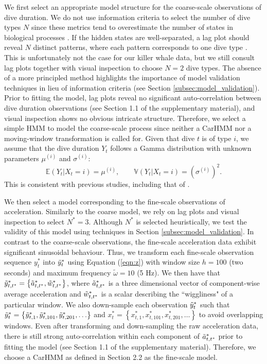 We first select an appropriate model structure for the coarse-scale observations of dive duration.
%
We do not use information criteria to select the number of dive types $N$ since these metrics tend to overestimate the number of states in biological processes \citep{Pohle:2017}. If the hidden states are well-separated, a lag plot should reveal $N$ distinct patterns, where each pattern corresponds to one dive type \citep{Lawler:2019}. This is unfortunately not the case for our killer whale data, but we still consult lag plots together with visual inspection to choose $N = 2$ dive types. The absence of a more principled method highlights the importance of model validation techniques in lieu of information criteria (see Section \ref{subsec:model_validation}).
%
Prior to fitting the model, lag plots reveal no significant auto-correlation between dive duration observations (see Section 1.1 of the supplementary material), and visual inspection shows no obvious intricate structure. Therefore, we select a simple HMM to model the coarse-scale process since neither a CarHMM nor a moving-window transformation is called for.
%
Given that dive $t$ is of type $i$, we assume that the dive duration $Y_t$ follows a Gamma distribution with unknown parameters $\mu^{(i)}$ and $\sigma^{(i)}$:
%
$$\mathbb{E}(Y_t|X_t = i) = \mu^{(i)}, \qquad \mathbb{V}(Y_t|X_t = i) = \left(\sigma^{(i)}\right)^2.$$
%
This is consistent with previous studies, including that of \citet{Barajas:2017}. 
%

We then select a model corresponding to the fine-scale observations of acceleration. Similarly to the coarse model, we rely on lag plots and visual inspection to select $N^*=3$. Although $N^*$ is selected heuristically, we test the validity of this model using techniques in Section \ref{subsec:model_validation}.
%
In contrast to the coarse-scale observations, the fine-scale acceleration data exhibit significant sinusoidal behaviour. Thus, we transform each fine-scale observation sequence $y_t^*$ into $\tilde{y}^*_t$ using Equation (\ref{eqn:z}) with window size $h=100$ (two seconds) and maximum frequency $\tilde{\omega}=10$ (5 Hz). 
We then have that $\tilde{y}^*_{t,t^*} = \left\{\tilde{a}^*_{t,t^*},\tilde{w}^*_{t,t^*}\right\}$, where $\tilde{a}^*_{t,t^*}$ is a three dimensional vector of component-wise average acceleration and $\tilde{w}^*_{t,t^*}$ is a scalar describing the ``wiggliness" of a particular window. We also down-sample each observation $\tilde{y}^*_t$ such that $\tilde{y}^*_t = \left\{\tilde{y}^*_{t,1},\tilde{y}^*_{t,101},\tilde{y}^*_{t,201},\ldots\right\}$ and $x^*_t = \left\{x^*_{t,1},x^*_{t,101},x^*_{t,201},\ldots\right\}$ to avoid overlapping windows. Even after transforming and down-sampling the raw acceleration data, there is still strong auto-correlation within each component of $\tilde{a}^*_{t,t^*}$ prior to fitting the model (see Section 1.1 of the supplementary material). Therefore, we choose a CarHMM as defined in Section 2.2 as the fine-scale model.

